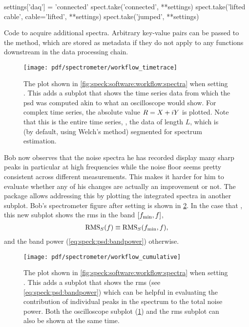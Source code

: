 \begin{listing}[htpb]
    \begin{py}
        settings['daq'] = 'connected'
        spect.take('connected', **settings)
        spect.take('lifted cable', cable='lifted', **settings)
        spect.take('jumped', **settings)
    \end{py}
    \caption[]{
        Code to acquire additional spectra.
        Arbitrary key-value pairs can be passed to the  method, which are stored as metadata if they do not apply to any functions downstream in the data processing chain.
    }
    \label{lst:speck:workflow:spectra}
\end{listing}
\begin{figure}
    \centering
    \texttt{[image: pdf/spectrometer/workflow\_timetrace]}
    \caption{
        The \pyspeck plot shown in \cref{fig:speck:software:workflow:spectra} when setting .
        This adds a subplot that shows the time series data from which the \gls{psd} was computed akin to what an oscilloscope would show.
        For complex time series, the absolute value $R = X + i Y$ is plotted.
        Note that this is the entire time series, \ie, the data of length $L$, which is (by default, using Welch's method) segmented for spectrum estimation.
    }
    \label{fig:speck:software:workflow:timetrace}
\end{figure}

Bob now observes that the noise spectra he has recorded display many sharp peaks in particular at high frequencies while the \oneoverf noise floor seems pretty consistent across different measurements.
This makes it harder for him to evaluate whether any of his changes are actually an improvement or not.
The \pyspeck package allows addressing this by plotting the integrated spectra in another subplot.
Bob's spectrometer figure after setting  is shown in \cref{fig:speck:software:workflow:cumulative}.
In the case that , this new subplot shows the \gls{rms} in the band $[f_{\mathrm{min}}, f]$,
\begin{align}\label{eq:speck:software:cumulative}
    \operatorname{RMS}_S(f)\equiv\operatorname{RMS}_S(f_{\mathrm{min}}, f),
\end{align}
and the band power (\cref{eq:speck:psd:bandpower}) otherwise.

\begin{figure}
    \centering
    \texttt{[image: pdf/spectrometer/workflow\_cumulative]}
    \caption{
        The \pyspeck plot shown in \cref{fig:speck:software:workflow:spectra} when setting .
        This adds a subplot that shows the \gls{rms} (see \cref{eq:speck:psd:bandpower}) which can be helpful in evaluating the contribution of individual peaks in the spectrum to the total noise power.
        Both the oscilloscope subplot (\cref{fig:speck:software:workflow:timetrace}) and the \gls{rms} subplot can also be shown at the same time.
    }
    \label{fig:speck:software:workflow:cumulative}
\end{figure}

